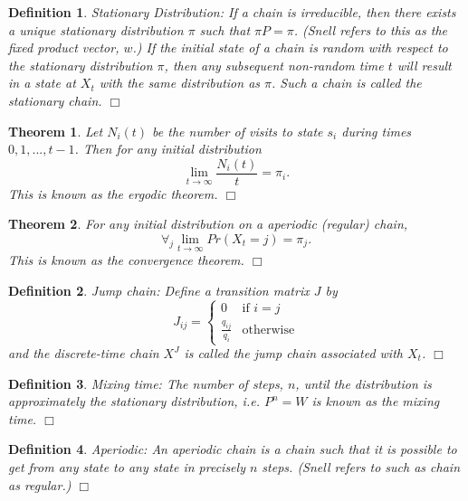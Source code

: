 \documentclass[11pt, letterpaper]{article}
\newenvironment{definition}
{\noindent\begin{defn}}
{\hfill $\Box$ \end{defn}}
\newtheorem{defn}{Definition}
\newenvironment{theorem}
{\noindent\begin{thm}}
{\hfill $\Box$ \end{thm}}
\newtheorem{thm}{Theorem}
\begin{document}
\begin{definition}
\textit{Stationary Distribution}: If a chain is irreducible, then there exists a unique \textit{stationary distribution} $\pi$ such that $\pi P = \pi$.  (Snell refers to this as the \textit{fixed product vector}, $w$.)  If the initial state of a chain is random with respect to the stationary distribution $\pi$, then any subsequent non-random time $t$ will result in a state at $X_t$ with the same distribution as $\pi$.  Such a chain is called the \textit{stationary chain}.
\end{definition}

\begin{theorem}
Let $N_i(t)$ be the number of visits to state $s_i$ during times $0, 1, ... , t-1$.  Then for any initial distribution
\[
	\lim_{t \rightarrow \infty} \frac{N_i(t)}{t} = \pi_i.
\]
This is known as the ergodic theorem.
\end{theorem}

\begin{theorem}
For any initial distribution on a aperiodic (regular) chain,
\[
	\forall_j \lim_{t \rightarrow \infty} Pr(X_t=j) = \pi_j.
\]
This is known as the convergence theorem.
\end{theorem}


\begin{definition}
\textit{Jump chain}: Define a transition matrix $J$ by
\[
	J_{ij} = \begin{cases}
			0 & \mbox{if } i = j \\
			\frac{q_{ij}}{q_i} & \mbox{otherwise}
	         \end{cases}
\]
and the discrete-time chain $X^J$ is called the \textit{jump chain} associated with $X_t$.
\end{definition}



\begin{definition}
\textit{Mixing time}: The number of steps, $n$, until the distribution is approximately the stationary distribution, i.e. $P^n = W$ is known as the \textit{mixing time}.
\end{definition}

\begin{definition}
\textit{Aperiodic}: An \textit{aperiodic} chain is a chain such that it is possible to get from any state to any state in precisely $n$ steps. (Snell refers to such as chain as \textit{regular}.)
\end{definition}
\end{document}
